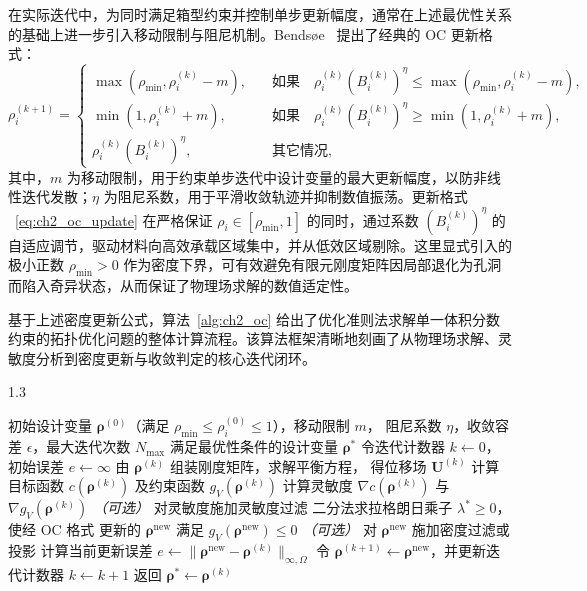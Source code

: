 在实际迭代中，为同时满足箱型约束并控制单步更新幅度，通常在上述最优性关系的基础上进一步引入移动限制与阻尼机制。Bendsøe~\cite{bendsoeOptimizationStructuralTopology1995a} 提出了经典的 OC 更新格式：
\begin{equation} 
	\rho_i^{(k+1)} = 
	\begin{cases} 
		\max(\rho_{\min},\rho_i^{(k)}-m),\quad&\text{如果}\quad \rho_i^{(k)}(B_i^{(k)})^\eta \leq \max(\rho_{\min},\rho_i^{(k)}-m),\\ 
		\min(1,\rho_i^{(k)}+m),\quad&\text{如果}\quad \rho_i^{(k)}(B_i^{(k)})^\eta \geq \min(1,\rho_i^{(k)}+m),\\ 
		\rho_i^{(k)}(B_i^{(k)})^\eta,\quad&\text{其它情况}, 
	\end{cases}
	\label{eq:ch2_oc_update}
\end{equation}
其中，$m$ 为移动限制，用于约束单步迭代中设计变量的最大更新幅度，以防非线性迭代发散；$\eta$ 为阻尼系数，用于平滑收敛轨迹并抑制数值振荡。更新格式 ~\eqref{eq:ch2_oc_update} 在严格保证 $\rho_i \in [\rho_{\min}, 1]$ 的同时，通过系数 $(B_i^{(k)})^\eta$ 的自适应调节，驱动材料向高效承载区域集中，并从低效区域剔除。这里显式引入的极小正数 $\rho_{\min} > 0$ 作为密度下界，可有效避免有限元刚度矩阵因局部退化为孔洞而陷入奇异状态，从而保证了物理场求解的数值适定性。

基于上述密度更新公式，算法~\ref{alg:ch2_oc} 给出了优化准则法求解单一体积分数约束的拓扑优化问题的整体计算流程。该算法框架清晰地刻画了从物理场求解、灵敏度分析到密度更新与收敛判定的核心迭代闭环。
\begin{algorithm}[h]
	\caption{OC 法求解体积分数约束的拓扑优化问题}
	\label{alg:ch2_oc}
	\begin{spacing}{1.3}
		\begin{algorithmic}[1]
			\Require 初始设计变量 $\boldsymbol{\rho}^{(0)}$（满足
			$\rho_{\min} \leq \rho_i^{(0)} \leq 1$），移动限制 $m$，
			阻尼系数 $\eta$，收敛容差 $\epsilon$，最大迭代次数 $N_{\max}$
			\Ensure 满足最优性条件的设计变量 $\boldsymbol{\rho}^*$
			\State 令迭代计数器 $k \gets 0$，初始误差 $e \gets \infty$
			\State 由 $\boldsymbol{\rho}^{(k)}$ 组装刚度矩阵，求解平衡方程，
			得位移场 $\boldsymbol{U}^{(k)}$
			\State 计算目标函数 $c(\boldsymbol{\rho}^{(k)})$
			及约束函数 $g_V(\boldsymbol{\rho}^{(k)})$
			\State 计算灵敏度 $\nabla c(\boldsymbol{\rho}^{(k)})$
			与 $\nabla g_V(\boldsymbol{\rho}^{(k)})$
			\State \textit{（可选）} 对灵敏度施加灵敏度过滤
			\State 二分法求拉格朗日乘子 $\lambda^* \geq 0$，使经 OC 格式
			更新的 $\boldsymbol{\rho}^{\mathrm{new}}$ 满足
			$g_V(\boldsymbol{\rho}^{\mathrm{new}}) \leq 0$
			\State \textit{（可选）} 对 $\boldsymbol{\rho}^{\mathrm{new}}$
			施加密度过滤或投影
			\State 计算当前更新误差
			$e \gets \|\boldsymbol{\rho}^{\mathrm{new}}
			- \boldsymbol{\rho}^{(k)}\|_{\infty,\Omega}$
			\State 令
			$\boldsymbol{\rho}^{(k+1)} \gets \boldsymbol{\rho}^{\mathrm{new}}$，并更新迭代计数器
			$k \gets k + 1$
			\EndWhile
			\State 返回 $\boldsymbol{\rho}^* \gets \boldsymbol{\rho}^{(k)}$
		\end{algorithmic}
	\end{spacing}
\end{algorithm}


